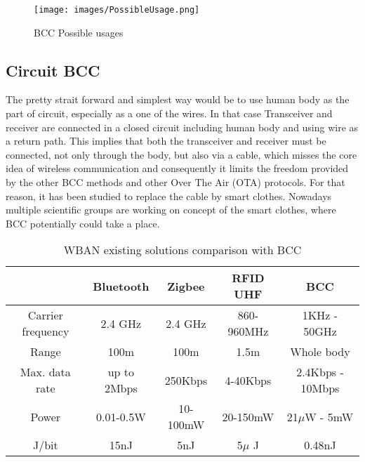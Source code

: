 {\begin{figure}[!h]
    \centering
    \texttt{[image: images/PossibleUsage.png]}
    \caption{BCC Possible usages}
    \label{fig:bcc_usage}
\end{figure}

\subsection{Circuit BCC}

\quad The pretty strait forward and simplest way would be to use human body as the part of circuit, especially as a one of the wires. In that case Transceiver and receiver are connected in a closed circuit including human body and using wire as a return path. This implies that both the transceiver and receiver must be connected, not only through the body, but also via a cable, which misses the core idea of wireless communication and consequently it limits the freedom provided by the other BCC methods and other Over The Air (OTA) protocols. For that reason, it has been studied to replace the cable by smart clothes. Nowadays multiple scientific groups are working on concept of the smart clothes, where BCC potentially could take a place. 

\begin{table}
\footnotesize
\begin{minipage}[b]{\hsize}\centering

 \caption {WBAN existing solutions comparison with BCC} 

  \begin{tabular}{*{5}{|c}|}

    \hline
        &   Bluetooth   &   Zigbee    &   RFID UHF   & BCC \\\hline
    Carrier frequency   &   2.4 GHz     &   2.4 GHz     &   860-960MHz  &   1KHz - 50GHz \\\hline 
    Range               &   100m        &   100m        &   1.5m    &   Whole body \\ \hline
    Max. data rate      &   up to 2Mbps &   250Kbps     &   4-40Kbps    &   2.4Kbps - 10Mbps \\ \hline
    Power               &   0.01-0.5W   &   10-100mW    &   20-150mW    &   21$\mu$W - 5mW \\ \hline
    J/bit               &   15nJ        &   5nJ         &   5$\mu$ J    &   0.48nJ \\ \hline
    \end{tabular}


\end{minipage}
\end{table}}

